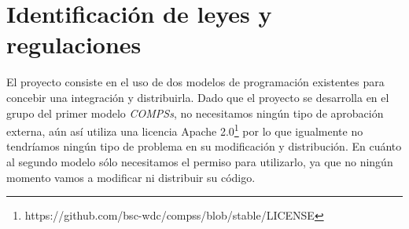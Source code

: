 \section{Identificación de leyes y regulaciones}

El proyecto consiste en el uso de dos modelos de programación existentes para concebir una integración y distribuirla. Dado que el proyecto se desarrolla en el grupo del primer modelo \textit{COMPSs}, no necesitamos ningún tipo de aprobación externa, aún así utiliza una licencia Apache 2.0\footnote{https://github.com/bsc-wdc/compss/blob/stable/LICENSE} por lo que igualmente no tendríamos ningún tipo de problema en su modificación y distribución. En cuánto al segundo modelo sólo necesitamos el permiso para utilizarlo, ya que no ningún momento vamos a modificar ni distribuir su código.


